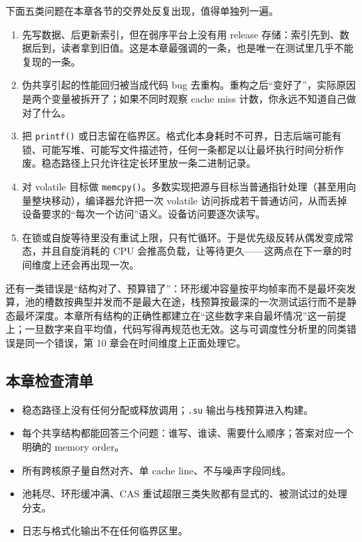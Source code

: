 \documentclass[12pt,a4paper,fontset=fandol]{ctexbook}
\newcommand{\Fn}[1]{\texttt{#1()}}
\begin{document}
下面五类问题在本章各节的交界处反复出现，值得单独列一遍。

\begin{enumerate}
\item 先写数据、后更新索引，但在弱序平台上没有用 release 存储：索引先到、数据后到，读者拿到旧值。这是本章最强调的一条，也是唯一在测试里几乎不能复现的一条。
\item 伪共享引起的性能回归被当成代码 bug 去重构。重构之后“变好了”，实际原因是两个变量被拆开了；如果不同时观察 cache miss 计数，你永远不知道自己做对了什么。
\item 把 \Fn{printf} 或日志留在临界区。格式化本身耗时不可界，日志后端可能有锁、可能写堆、可能写文件描述符，任何一条都足以让最坏执行时间分析作废。稳态路径上只允许往定长环里放一条二进制记录。
\item 对 volatile 目标做 \Fn{memcpy}。多数实现把源与目标当普通指针处理（甚至用向量整块移动），编译器允许把一次 volatile 访问拆成若干普通访问，从而丢掉设备要求的“每次一个访问”语义。设备访问要逐次读写。
\item 在锁或自旋等待里没有重试上限，只有忙循环。于是优先级反转从偶发变成常态，并且自旋消耗的 CPU 会推高负载，让等待更久——这两点在下一章的时间维度上还会再出现一次。
\end{enumerate}

还有一类错误是“结构对了、预算错了”：环形缓冲容量按平均帧率而不是最坏突发算，池的槽数按典型并发而不是最大在途，栈预算按最深的一次测试运行而不是静态最坏深度。本章所有结构的正确性都建立在“这些数字来自最坏情况”这一前提上；一旦数字来自平均值，代码写得再规范也无效。这与可调度性分析里的同类错误是同一个错误，第 10 章会在时间维度上正面处理它。

\subsection*{本章检查清单}

\begin{itemize}
\item 稳态路径上没有任何分配或释放调用；\texttt{.su} 输出与栈预算进入构建。
\item 每个共享结构都能回答三个问题：谁写、谁读、需要什么顺序；答案对应一个明确的 memory order。
\item 所有跨核原子量自然对齐、单 cache line、不与噪声字段同线。
\item 池耗尽、环形缓冲满、CAS 重试超限三类失败都有显式的、被测试过的处理分支。
\item 日志与格式化输出不在任何临界区里。
\end{itemize}
\end{document}

